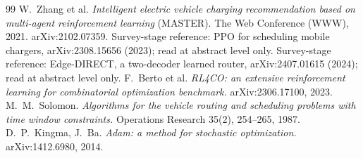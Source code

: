 \documentclass[11pt,a4paper]{article}
\theoremstyle{plain}
\theoremstyle{definition}
\renewcommand{\_}{\origunderscore\allowbreak}
\begin{document}
\begin{thebibliography}{99}
 W.~Zhang et al. \emph{Intelligent electric vehicle charging recommendation based on multi-agent reinforcement learning} (MASTER). The Web Conference (WWW), 2021. arXiv:2102.07359.
 Survey-stage reference: PPO for scheduling mobile chargers, arXiv:2308.15656 (2023); read at abstract level only.
 Survey-stage reference: Edge-DIRECT, a two-decoder learned router, arXiv:2407.01615 (2024); read at abstract level only.
 F.~Berto et al. \emph{RL4CO: an extensive reinforcement learning for combinatorial optimization benchmark.} arXiv:2306.17100, 2023.
 M.~M.~Solomon. \emph{Algorithms for the vehicle routing and scheduling problems with time window constraints.} Operations Research 35(2), 254--265, 1987.
 D.~P.~Kingma, J.~Ba. \emph{Adam: a method for stochastic optimization.} arXiv:1412.6980, 2014.
\end{thebibliography}
\end{document}
